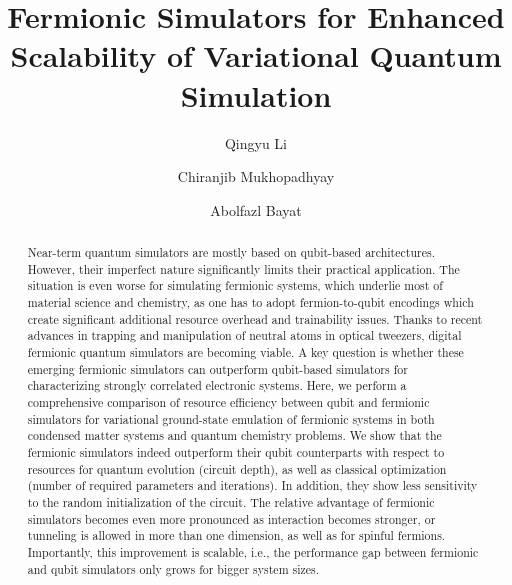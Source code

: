 \documentclass[aps, pra, reprint, superscriptaddress]{revtex4-1}
\begin{document}

\title{Fermionic Simulators for Enhanced Scalability of Variational Quantum Simulation} 

\author{Qingyu Li}
\author{Chiranjib Mukhopadhyay}
\author{Abolfazl Bayat}

\begin{abstract}
Near-term quantum simulators are mostly based on qubit-based architectures. However, their imperfect nature significantly limits their practical application. The situation is even worse for simulating fermionic systems, which underlie most of material science and chemistry, as one has to adopt fermion-to-qubit encodings which create significant additional resource overhead and trainability issues. Thanks to recent advances in trapping and manipulation of neutral atoms in optical tweezers, digital fermionic quantum simulators are becoming viable. A key question is whether these emerging fermionic simulators can outperform qubit-based simulators for characterizing strongly correlated electronic systems.  Here, we perform a comprehensive comparison of resource efficiency between qubit and fermionic simulators for variational ground-state emulation of fermionic systems in both condensed matter systems and quantum chemistry problems. We show that the fermionic simulators indeed outperform their qubit counterparts with respect to resources for quantum evolution (circuit depth), as well as classical optimization (number of required parameters and iterations). In addition, they show less sensitivity to the random initialization of the circuit. The relative advantage of fermionic simulators becomes even more pronounced as interaction becomes stronger,  or tunneling is allowed in more than one dimension, as well as for spinful fermions. Importantly, this improvement is scalable, i.e., the performance gap between fermionic and qubit simulators only grows for bigger system sizes. 
\end{abstract} 
\end{document}
